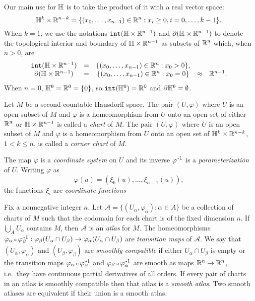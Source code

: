 \begin{defn}[Coordinates]
	\label{def:coordinates}
	
	Our main use for $\mathbb{H}$ is to take the product of it with a real vector space:
	\[
		\mathbb{H}^k\times\mathbb{R}^{n-k}=\{(x_0,\dots,x_{n-1})\in\mathbb{R}^n : x_i\geq 0, i=0,\dots,k-1\}.
	\]
	When $k=1$, we use the notations $\mathtt{int}(\mathbb{H}\times\mathbb{R}^{n-1})$ and $\partial (\mathbb{H}\times\mathbb{R}^{n-1})$ to denote the topological interior and boundary of $\mathbb{H}\times\mathbb{R}^{n-1}$ as subsets of $\mathbb{R}^n$ which, when $n>0$, are
	\[
		\begin{array}{ccccc}
			\mathtt{int}(\mathbb{H}\times\mathbb{R}^{n-1}) & = & \{(x_0,\dots,x_{n-1})\in\mathbb{R}^n : x_0 > 0\}, & &\\
			\partial (\mathbb{H}\times\mathbb{R}^{n-1})	& = & \{(x_0,\dots,x_{n-1})\in\mathbb{R}^n : x_0 = 0\} & \approx & \mathbb{R}^{n-1}.
		\end{array}
	\]
	When $n=0$, $\mathbb{H}^0 = \mathbb{R}^0 = \{0\}$, so $\mathtt{int}(\mathbb{H}^0)=\mathbb{R}^0$ and $\partial\mathbb{H}^0=\emptyset$.

	Let $M$ be a second-countable Hausdorff space.
	The pair $(U,\varphi)$ where $U$ is an open subset of $M$ and $\varphi$ is a homeomorphism from $U$ onto an open set of either $\mathbb{R}^n$ or $\mathbb{H}\times\mathbb{R}^{n-1}$ is called a \emph{chart} of $M$.
	The pair $(U,\varphi)$ where $U$ is an open subset of $M$ and $\varphi$ is a homeomorphism from $U$ onto an open set of $\mathbb{H}^k\times\mathbb{R}^{n-k}$, $1<k\leq n$, is called a \emph{corner chart} of $M$.
	
	The map $\varphi$ is a \emph{coordinate system} on $U$ and its inverse $\varphi^{\,\text{-}1}$ is a \emph{parameterization} of $U$.
	Writing $\varphi$ as
	\[
		\varphi(u) = (\xi_0(u),\dots,\xi_{n-1}(u)),
	\]
	the functions $\xi_i$ are \emph{coordinate functions}
\end{defn}

\begin{defn}[Atlas]
	\label{def:atlas}
	Fix a nonnegative integer $n$.
	Let $\mathcal{A}=\{(U_\alpha,\varphi_\alpha):\alpha\in A\}$ be a collection of charts of $M$ such that the codomain for each chart is of the fixed dimension $n$.
	If $\bigcup_A U_\alpha$ contains $M$, then $\mathcal{A}$ is an \emph{atlas} for $M$.
	The homeomorphisms $\varphi_\alpha\comp \varphi_\beta\inv:\varphi_\beta(U_\alpha\cap U_\beta)\to \varphi_\alpha(U_\alpha\cap U_\beta)$ are \emph{transition maps} of $\mathcal{A}$.
	We say that $(U_\alpha,\varphi_\alpha)$ and $(U_\beta,\varphi_\beta)$ are \emph{smoothly compatible} if either $U_\alpha\cap U_\beta$ is empty or the transition maps $\varphi_\alpha\comp \varphi_\beta\inv$ and $\varphi_\beta\comp \varphi_\alpha\inv$ are smooth as maps $\mathbb{R}^n\to\mathbb{R}^n$, i.e.\ they have continuous partial derivatives of all orders.
	If every pair of charts in an atlas is smoothly compatible then that atlas is a \emph{smooth atlas}.
	Two smooth atlases are equivalent if their union is a smooth atlas.
\end{defn}

